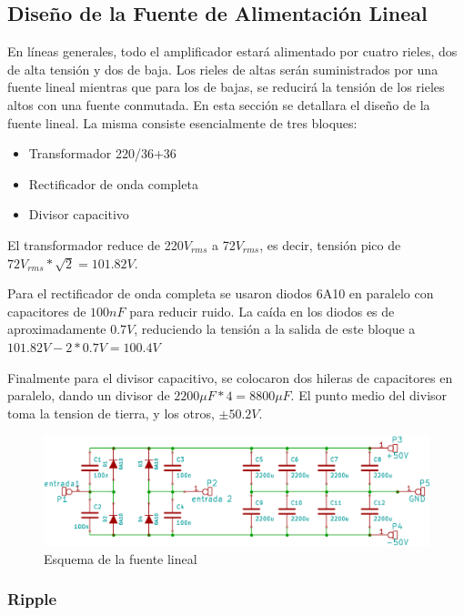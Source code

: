 \subsection{Diseño de la Fuente de Alimentación Lineal}
\bigskip 

En líneas generales, todo el amplificador estará alimentado por cuatro rieles, dos de alta tensión y dos de baja. Los rieles de altas serán suministrados por una fuente lineal mientras que para los de bajas, se reducirá la tensión de los rieles altos con una fuente conmutada. En esta sección se detallara el diseño de la fuente lineal. La misma consiste esencialmente de tres bloques:

\begin{itemize}
\item Transformador 220/36+36
\item Rectificador de onda completa
\item Divisor capacitivo 
\end{itemize}

El transformador reduce de 220$V_{rms}$ a 72$V_{rms}$, es decir, tensión pico de $72V_{rms}*\sqrt{2}=101.82V$.

Para el rectificador de onda completa se usaron diodos 6A10 en paralelo con capacitores de $100nF$ para reducir ruido. La caída en los diodos es de aproximadamente $0.7V$, reduciendo la tensión a la salida de este bloque a $101.82V-2*0.7V=100.4V$

Finalmente para el divisor capacitivo, se colocaron dos hileras de capacitores en paralelo, dando un divisor de $2200{\mu}F*4=8800{\mu}F$. El punto medio del divisor toma la tension de tierra, y los otros, $\pm50.2V$.


\begin{figure}[H]
\centering
\centerline{\includegraphics[scale=0.4]{img/esquema_fuente_lineal.png}}
\caption{Esquema de la fuente lineal}
\label{esquema_fuente_lineal} 
\end{figure}
\medskip
\subsubsection*{Ripple}

